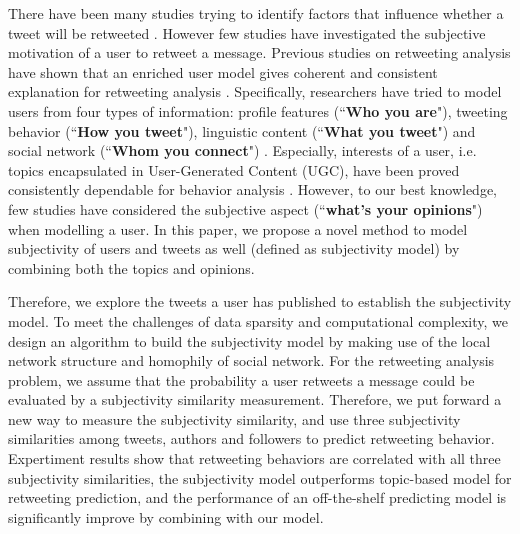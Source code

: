 \documentclass{acm_proc_article-sp}
\begin{document}
There have been many studies trying to identify factors that influence whether a tweet will be retweeted \cite{boyd2010tweet,kwak2010twitter}. However few studies have investigated the subjective motivation of a user to retweet a message. 
Previous studies on retweeting analysis have shown that an enriched user model gives coherent and consistent explanation for retweeting analysis \cite{macskassy2011people,feng2013retweet}. 
Specifically, researchers have tried to model users from four types of information:
profile features (``\textbf{Who you are}"), tweeting behavior (``\textbf{How you tweet}"), linguistic content (``\textbf{What you tweet}") and social network (``\textbf{Whom you connect}") \cite{pennacchiotti2011machine}. 
Especially, interests of a user, i.e. topics encapsulated in User-Generated Content (UGC), have been proved consistently dependable for behavior analysis \cite{petrovic2011rt}. 
However, to our best knowledge, few studies have considered the subjective aspect (``\textbf{what's your opinions}") when modelling a user. 
In this paper, we propose a novel method to model subjectivity of users and tweets as well (defined as subjectivity model) by combining both the topics and opinions. 


Therefore, we explore the tweets a user has published to establish the subjectivity model. 
To meet the challenges of data sparsity and computational complexity, we design an algorithm to build the subjectivity model by making use of the local network structure and homophily of social network. 
For the retweeting analysis problem, we assume that the probability a user retweets a message could be evaluated by a subjectivity similarity measurement. 
Therefore, we put forward a new way to measure the subjectivity similarity, and use three subjectivity similarities among tweets, authors and followers to predict retweeting behavior. 
Expertiment results show that retweeting behaviors are correlated with all three subjectivity similarities, the subjectivity model outperforms topic-based model for retweeting prediction, and the performance of an off-the-shelf predicting model is significantly improve by combining with our model. 
\end{document}
